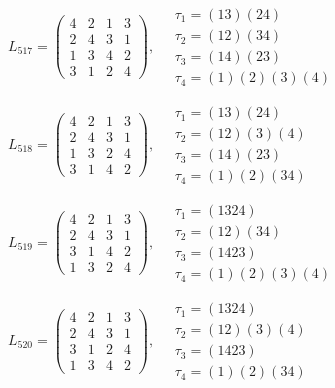 $L_{517} = \begin{pmatrix} 4 & 2 & 1 & 3 \\ 2 & 4 & 3 & 1 \\ 1 & 3 & 4 & 2 \\ 3 & 1 & 2 & 4 \end{pmatrix}, \quad \begin{matrix} \tau_{1} = (1 3)(2 4) \\ \tau_{2} = (1 2)(3 4) \\ \tau_{3} = (1 4)(2 3) \\ \tau_{4} = (1)(2)(3)(4) \end{matrix}$

$L_{518} = \begin{pmatrix} 4 & 2 & 1 & 3 \\ 2 & 4 & 3 & 1 \\ 1 & 3 & 2 & 4 \\ 3 & 1 & 4 & 2 \end{pmatrix}, \quad \begin{matrix} \tau_{1} = (1 3)(2 4) \\ \tau_{2} = (1 2)(3)(4) \\ \tau_{3} = (1 4)(2 3) \\ \tau_{4} = (1)(2)(3 4) \end{matrix}$

$L_{519} = \begin{pmatrix} 4 & 2 & 1 & 3 \\ 2 & 4 & 3 & 1 \\ 3 & 1 & 4 & 2 \\ 1 & 3 & 2 & 4 \end{pmatrix}, \quad \begin{matrix} \tau_{1} = (1 3 2 4) \\ \tau_{2} = (1 2)(3 4) \\ \tau_{3} = (1 4 2 3) \\ \tau_{4} = (1)(2)(3)(4) \end{matrix}$

$L_{520} = \begin{pmatrix} 4 & 2 & 1 & 3 \\ 2 & 4 & 3 & 1 \\ 3 & 1 & 2 & 4 \\ 1 & 3 & 4 & 2 \end{pmatrix}, \quad \begin{matrix} \tau_{1} = (1 3 2 4) \\ \tau_{2} = (1 2)(3)(4) \\ \tau_{3} = (1 4 2 3) \\ \tau_{4} = (1)(2)(3 4) \end{matrix}$

